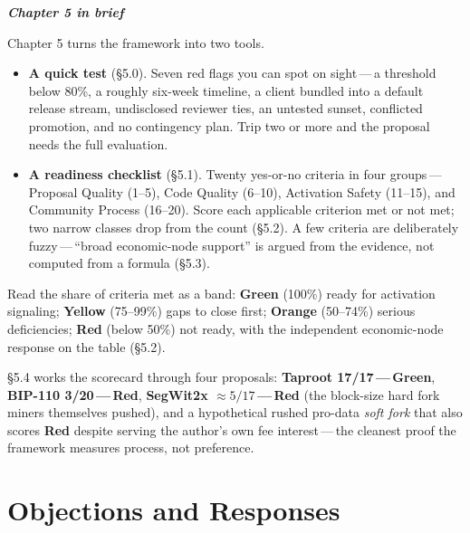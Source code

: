 \documentclass[11pt, twoside, openright]{book}
\newcommand{\sect}[1]{\S#1}
\newcommand{\peheader}[1]{{\itshape\bfseries #1}\par\vspace{4pt}}
\begin{document}
\needspace{5in}
\begin{plainenglish}
\peheader{Chapter 5 in brief}

Chapter 5 turns the framework into two tools.

\begin{itemize}[topsep=3pt, itemsep=3pt, parsep=1pt, leftmargin=1.4em]
  \item \textbf{A quick test} (\sect{5.0}). Seven red flags you can spot on sight\,---\,a threshold below 80\%, a roughly six-week timeline, a client bundled into a default release stream, undisclosed reviewer ties, an untested sunset, conflicted promotion, and no contingency plan. Trip two or more and the proposal needs the full evaluation.
  \item \textbf{A readiness checklist} (\sect{5.1}). Twenty yes-or-no criteria in four groups\,---\,Proposal Quality (1--5), Code Quality (6--10), Activation Safety (11--15), and Community Process (16--20). Score each applicable criterion met or not met; two narrow classes drop from the count (\sect{5.2}). A few criteria are deliberately fuzzy\,---\,``broad economic-node support'' is argued from the evidence, not computed from a formula (\sect{5.3}).
\end{itemize}

Read the share of criteria met as a band: \textbf{Green} (100\%) ready for activation signaling; \textbf{Yellow} (75--99\%) gaps to close first; \textbf{Orange} (50--74\%) serious deficiencies; \textbf{Red} (below 50\%) not ready, with the independent economic-node response on the table (\sect{5.2}).

\sect{5.4} works the scorecard through four proposals: \textbf{Taproot 17/17\,---\,Green}, \textbf{BIP-110 3/20\,---\,Red}, \textbf{SegWit2x ${\approx}5/17$\,---\,Red} (the block-size hard fork miners themselves pushed), and a hypothetical rushed pro-data \textit{soft fork} that also scores \textbf{Red} despite serving the author's own fee interest\,---\,the cleanest proof the framework measures process, not preference.
\end{plainenglish}

\chapter{Objections and Responses}
\label{ch:objections}
\end{document}

